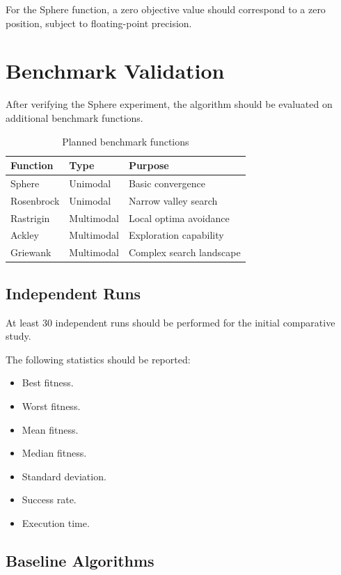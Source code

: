 \documentclass[12pt,a4paper]{report}
\begin{document}
For the Sphere function, a zero objective value
should correspond to a zero position, subject to
floating-point precision.

\chapter{Benchmark Validation}

After verifying the Sphere experiment, the algorithm
should be evaluated on additional benchmark functions.

\begin{table}[H]
\centering
\caption{Planned benchmark functions}
\begin{tabular}{lll}
\toprule
\textbf{Function} & \textbf{Type} & \textbf{Purpose}\\
\midrule
Sphere & Unimodal & Basic convergence\\
Rosenbrock & Unimodal & Narrow valley search\\
Rastrigin & Multimodal & Local optima avoidance\\
Ackley & Multimodal & Exploration capability\\
Griewank & Multimodal & Complex search landscape\\
\bottomrule
\end{tabular}
\end{table}

\section{Independent Runs}

At least 30 independent runs should be performed
for the initial comparative study.

The following statistics should be reported:

\begin{itemize}
    \item Best fitness.
    \item Worst fitness.
    \item Mean fitness.
    \item Median fitness.
    \item Standard deviation.
    \item Success rate.
    \item Execution time.
\end{itemize}

\section{Baseline Algorithms}
\end{document}

